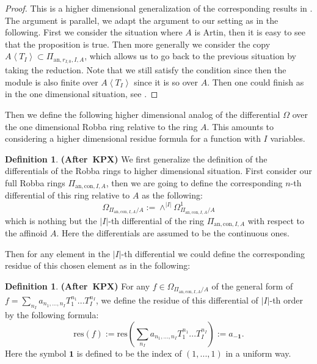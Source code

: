 \documentclass[12pt]{amsart}
\theoremstyle{definition}
\newtheorem{definition}[theorem]{Definition}
\numberwithin{equation}{section}
\begin{document}
\begin{proof}
This is a higher dimensional generalization of the corresponding results in \cite[Lemma 2.1.18]{KPX}. The argument is parallel, we adapt the argument to our setting as in the following. First we consider the situation where $A$ is Artin, then it is easy to see that the proposition is true. Then more generally we consider the copy $A\left<T_I\right>\subset \Pi_{\mathrm{an},r_{I,0},I,A}$, which allows us to go back to the previous situation by taking the reduction. Note that we still satisfy the condition since then the module is also finite over $A\left<T_I\right>$ since it is so over $A$. Then one could finish as in the one dimensional situation, see \cite[Lemma 2.1.18]{KPX}.	
\end{proof}


\indent Then we define the following higher dimensional analog of the differential $\Omega$ over the one dimensional Robba ring relative to the ring $A$. This amounts to considering a higher dimensional residue formula for a function with $I$ variables.


\begin{definition} \mbox{\bf{(After KPX)}}
We first generalize the definition of the differentials of the Robba rings to higher dimensional situation. First consider our full Robba rings $\Pi_{\mathrm{an},\mathrm{con},I,A}$, then we are going to define the corresponding $n$-th differential of this ring relative to $A$ as the following:
\begin{displaymath}
\Omega_{\Pi_{\mathrm{an},\mathrm{con},I,A}/A}:=\wedge^{|I|} \Omega^1_{\Pi_{\mathrm{an},\mathrm{con},I,A}/A}	
\end{displaymath}
which is nothing but the $|I|$-th differential of the ring $\Pi_{\mathrm{an},\mathrm{con},I,A}$ with respect to the affinoid $A$. Here the differentials are assumed to be the continuous ones.	
\end{definition}


\indent Then for any element in the $|I|$-th differential we could define the corresponding residue of this chosen element as in the following:

\begin{definition} \mbox{\bf{(After KPX)}}
For any $f\in \Omega_{\Pi_{\mathrm{an},\mathrm{con},I,A}/A}$ of the general form of $f=\sum_{n_I}a_{n_1,...,n_I}T_1^{n_1}...T_I^{n_I}$, we define the residue of this differential of $|I|$-th order by the following formula:
\begin{displaymath}
\mathrm{res}(f):=\mathrm{res}(\sum_{n_I}a_{n_1,...,n_I}T_1^{n_1}...T_I^{n_I}):= a_{-\mathbf{1}}.	
\end{displaymath}
Here the symbol $\mathbf{1}$ is defined to be the index of $(1,...,1)$ in a uniform way.	
\end{definition}
\end{document}
